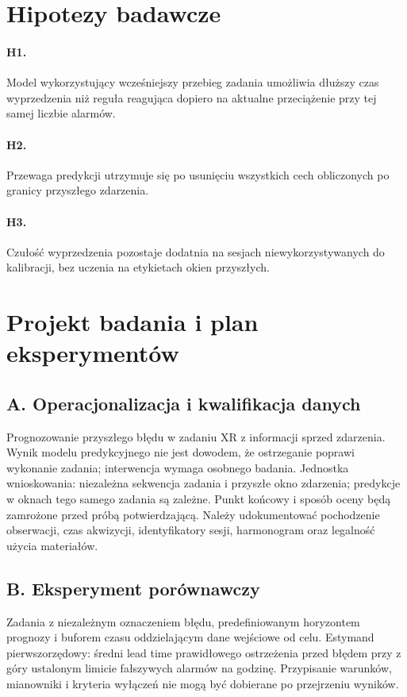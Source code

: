 \documentclass[11pt,a4paper]{article}
\begin{document}
\section{Hipotezy badawcze}
\paragraph{H1.} Model wykorzystujący wcześniejszy przebieg zadania umożliwia dłuższy czas wyprzedzenia niż reguła reagująca dopiero na aktualne przeciążenie przy tej samej liczbie alarmów.
\paragraph{H2.} Przewaga predykcji utrzymuje się po usunięciu wszystkich cech obliczonych po granicy przyszłego zdarzenia.
\paragraph{H3.} Czułość wyprzedzenia pozostaje dodatnia na sesjach niewykorzystywanych do kalibracji, bez uczenia na etykietach okien przyszłych.

\section{Projekt badania i plan eksperymentów}
\subsection{A. Operacjonalizacja i kwalifikacja danych}
Prognozowanie przyszłego błędu w zadaniu XR z informacji sprzed zdarzenia. Wynik modelu predykcyjnego nie jest dowodem, że ostrzeganie poprawi wykonanie zadania; interwencja wymaga osobnego badania. Jednostka wnioskowania: niezależna sekwencja zadania i przyszłe okno zdarzenia; predykcje w oknach tego samego zadania są zależne. Punkt końcowy i sposób oceny będą zamrożone przed próbą potwierdzającą. Należy udokumentować pochodzenie obserwacji, czas akwizycji, identyfikatory sesji, harmonogram oraz legalność użycia materiałów.

\subsection{B. Eksperyment porównawczy}
Zadania z niezależnym oznaczeniem błędu, predefiniowanym horyzontem prognozy i buforem czasu oddzielającym dane wejściowe od celu. Estymand pierwszorzędowy: średni lead time prawidłowego ostrzeżenia przed błędem przy z góry ustalonym limicie fałszywych alarmów na godzinę. Przypisanie warunków, mianowniki i kryteria wyłączeń nie mogą być dobierane po przejrzeniu wyników.
\end{document}

